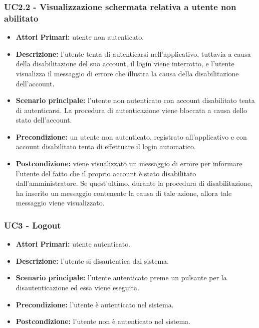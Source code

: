 \subsubsection{ UC2.2 - Visualizzazione schermata relativa a utente non abilitato}
\begin{itemize}
           	\item\textbf{Attori Primari:} utente non autenticato.
           	\item\textbf{Descrizione:} l'utente tenta di autenticarsi nell'applicativo, tuttavia a causa della disabilitazione del suo account, il login viene interrotto, e
           	l'utente visualizza il messaggio di errore che illustra la causa della disabilitazione dell'account.
           	\item\textbf{Scenario principale:} l’utente non autenticato con account disabilitato tenta di autenticarsi. 
           	La procedura di autenticazione viene bloccata a causa dello stato dell'account.
           	\item\textbf{Precondizione:} un utente non autenticato, registrato all'applicativo e con account disabilitato tenta di effettuare il login automatico. 
           	\item\textbf{Postcondizione:} viene visualizzato un messaggio di errore per informare l'utente del fatto che il 
           	proprio account è stato disabilitato dall'amministratore. Se quest'ultimo, durante la procedura di disabilitazione, ha inserito un messaggio contenente la causa di tale azione, allora tale messaggio viene visualizzato.
\end{itemize}

\subsubsection{ UC3 - Logout}
\begin{itemize}
	\item\textbf{Attori Primari:} 
	utente autenticato.
	\item\textbf{Descrizione:} 
	l'utente si disautentica dal sistema.
	\item\textbf{Scenario principale:} 
	l'utente autenticato preme un pulsante per la disautenticazione ed essa viene eseguita.
	\item\textbf{Precondizione:} 
	l'utente è autenticato nel sistema.
	\item\textbf{Postcondizione:}
	l'utente non è autenticato nel sistema.
\end{itemize}


